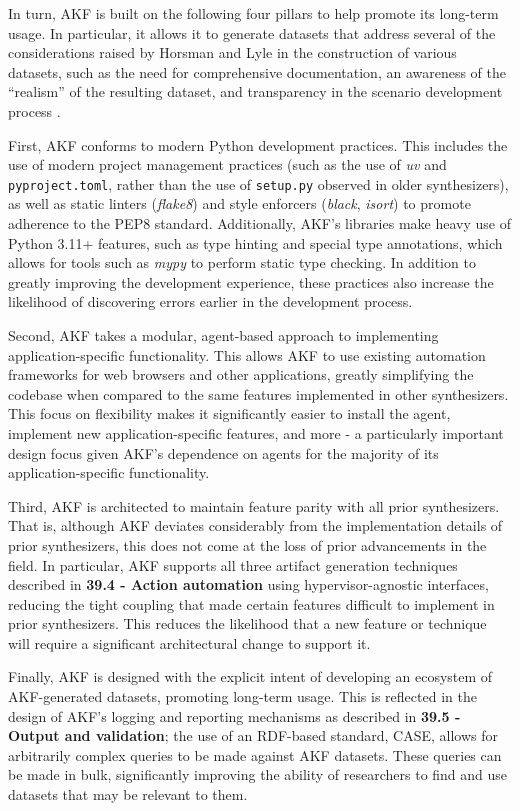 In turn, AKF is built on the following four pillars to help promote its
long-term usage. In particular, it allows it to generate datasets that
address several of the considerations raised by Horsman and Lyle in the
construction of various datasets, such as the need for comprehensive
documentation, an awareness of the ``realism'' of the resulting dataset,
and transparency in the scenario development process
\cite{horsmanDatasetConstructionChallenges2021}.

First, AKF conforms to modern Python development practices. This
includes the use of modern project management practices (such as the use
of \emph{uv} and \texttt{pyproject.toml}, rather than the use of
\texttt{setup.py} observed in older synthesizers), as well as static
linters (\emph{flake8}) and style enforcers (\emph{black}, \emph{isort})
to promote adherence to the PEP8 standard. Additionally, AKF's libraries
make heavy use of Python 3.11+ features, such as type hinting and
special type annotations, which allows for tools such as \emph{mypy} to
perform static type checking. In addition to greatly improving the
development experience, these practices also increase the likelihood of
discovering errors earlier in the development process.

Second, AKF takes a modular, agent-based approach to implementing
application-specific functionality. This allows AKF to use existing
automation frameworks for web browsers and other applications, greatly
simplifying the codebase when compared to the same features implemented
in other synthesizers. This focus on flexibility makes it significantly
easier to install the agent, implement new application-specific
features, and more - a particularly important design focus given AKF's
dependence on agents for the majority of its application-specific
functionality.

Third, AKF is architected to maintain feature parity with all prior
synthesizers. That is, although AKF deviates considerably from the
implementation details of prior synthesizers, this does not come at the
loss of prior advancements in the field. In particular, AKF supports all
three artifact generation techniques described in \textbf{39.4 - Action
automation} using hypervisor-agnostic interfaces, reducing the tight
coupling that made certain features difficult to implement in prior
synthesizers. This reduces the likelihood that a new feature or
technique will require a significant architectural change to support it.

Finally, AKF is designed with the explicit intent of developing an
ecosystem of AKF-generated datasets, promoting long-term usage. This is
reflected in the design of AKF's logging and reporting mechanisms as
described in \textbf{39.5 - Output and validation}; the use of an
RDF-based standard, CASE, allows for arbitrarily complex queries to be
made against AKF datasets. These queries can be made in bulk,
significantly improving the ability of researchers to find and use
datasets that may be relevant to them.

